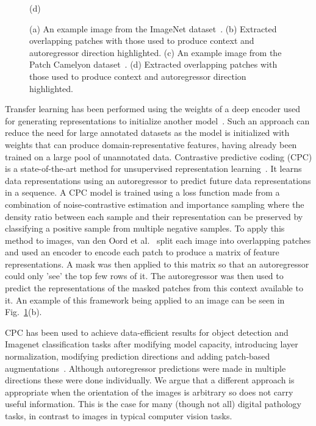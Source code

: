 \begin{figure}
\begin{minipage}[b]{.4\linewidth}
		\centerline{(d)}\medskip
	\end{minipage}
	\caption{(a) An example image from the ImageNet dataset~\cite{deng2009imagenet}. (b) Extracted overlapping patches with those used to produce context and autoregressor direction highlighted. (c) An example image from the Patch Camelyon dataset~\cite{veeling2018rotation}. (d) Extracted overlapping patches with those used to produce context and autoregressor direction highlighted.}
	\label{fig:example_cpc_patches}
\end{figure}

Transfer learning has been performed using the weights of a deep encoder used for generating representations to initialize another model~\cite{weiss2016survey}. Such an approach can reduce the need for large annotated datasets as the model is initialized with weights that can produce domain-representative features, having already been trained on a large pool of unannotated data. 
Contrastive predictive coding (CPC) is a state-of-the-art method for unsupervised representation learning~\cite{oord2018representation}. It learns data representations using an autoregressor to predict future data representations in a sequence. A CPC model is trained using a loss function made from a combination of noise-contrastive estimation and importance sampling where the density ratio between each sample and their representation can be preserved by classifying a positive sample from multiple negative samples. To apply this method to images, van den Oord et al.~\cite{oord2018representation} split each image into overlapping patches and used an encoder to encode each patch to produce a matrix of feature representations. A mask was then applied to this matrix so that an autoregressor could only 'see' the top few rows of it. The autoregressor was then used to predict the representations of the masked patches from this context available to it. An example of this framework being applied to an image can be seen in Fig.~\ref{fig:example_cpc_patches}(b). 

CPC has been used to achieve data-efficient results for object detection and Imagenet classification tasks after modifying model capacity, introducing layer normalization, modifying prediction directions and adding patch-based augmentations~\cite{henaff2019data}. Although autoregressor predictions were made in multiple directions these were done individually. We argue that a different approach is appropriate when the orientation of the images is arbitrary so does not carry useful information. This is the case for many (though not all) digital pathology tasks, in contrast to images in typical computer vision tasks. 


